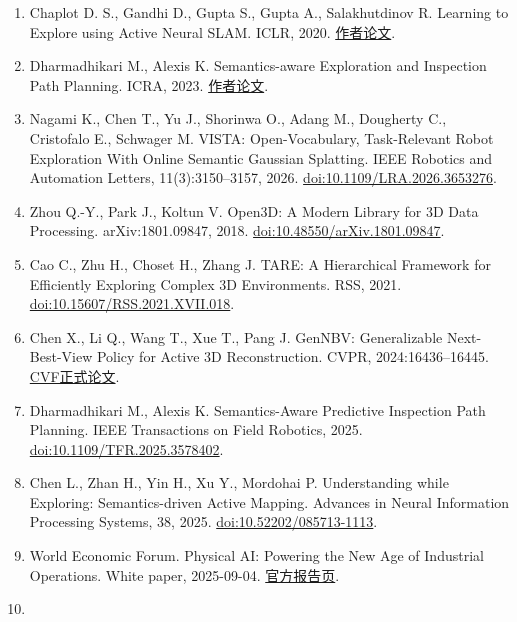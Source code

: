 \documentclass[11pt,a4paper]{article}
\providecommand{\tightlist}{\setlength{\itemsep}{0pt}\setlength{\parskip}{0pt}}
\begin{document}
\begin{enumerate}
\def\labelenumi{\arabic{enumi}.}
\tightlist
\item
  Chaplot D. S., Gandhi D., Gupta S., Gupta A., Salakhutdinov R. Learning to Explore using Active Neural SLAM. ICLR, 2020. \href{https://arxiv.org/abs/2004.05155}{作者论文}.
\item
  Dharmadhikari M., Alexis K. Semantics-aware Exploration and Inspection Path Planning. ICRA, 2023. \href{https://arxiv.org/abs/2303.07236}{作者论文}.
\item
  Nagami K., Chen T., Yu J., Shorinwa O., Adang M., Dougherty C., Cristofalo E., Schwager M. VISTA: Open-Vocabulary, Task-Relevant Robot Exploration With Online Semantic Gaussian Splatting. IEEE Robotics and Automation Letters, 11(3):3150--3157, 2026. \href{https://doi.org/10.1109/LRA.2026.3653276}{doi:10.1109/LRA.2026.3653276}.
\item
  Zhou Q.-Y., Park J., Koltun V. Open3D: A Modern Library for 3D Data Processing. arXiv:1801.09847, 2018. \href{https://doi.org/10.48550/arXiv.1801.09847}{doi:10.48550/arXiv.1801.09847}.
\item
  Cao C., Zhu H., Choset H., Zhang J. TARE: A Hierarchical Framework for Efficiently Exploring Complex 3D Environments. RSS, 2021. \href{https://doi.org/10.15607/RSS.2021.XVII.018}{doi:10.15607/RSS.2021.XVII.018}.
\item
  Chen X., Li Q., Wang T., Xue T., Pang J. GenNBV: Generalizable Next-Best-View Policy for Active 3D Reconstruction. CVPR, 2024:16436--16445. \href{https://openaccess.thecvf.com/content/CVPR2024/html/Chen_GenNBV_Generalizable_Next-Best-View_Policy_for_Active_3D_Reconstruction_CVPR_2024_paper.html}{CVF正式论文}.
\item
  Dharmadhikari M., Alexis K. Semantics-Aware Predictive Inspection Path Planning. IEEE Transactions on Field Robotics, 2025. \href{https://doi.org/10.1109/TFR.2025.3578402}{doi:10.1109/TFR.2025.3578402}.
\item
  Chen L., Zhan H., Yin H., Xu Y., Mordohai P. Understanding while Exploring: Semantics-driven Active Mapping. Advances in Neural Information Processing Systems, 38, 2025. \href{https://doi.org/10.52202/085713-1113}{doi:10.52202/085713-1113}.
\item
  World Economic Forum. Physical AI: Powering the New Age of Industrial Operations. White paper, 2025-09-04. \href{https://www.weforum.org/publications/physical-ai-powering-the-new-age-of-industrial-operations/}{官方报告页}.
\item

\end{enumerate}
\end{document}
